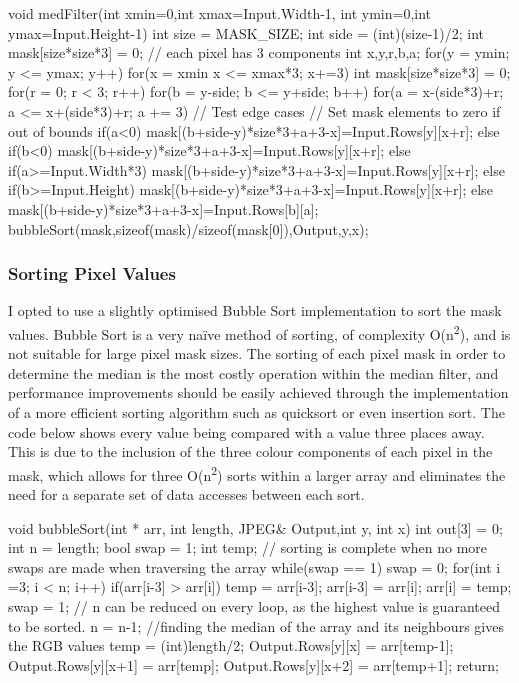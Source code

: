\begin{Cpp}

void medFilter(int xmin=0,int xmax=Input.Width-1,
               int ymin=0,int ymax=Input.Height-1){
  int size = MASK_SIZE;
  int side = (int)(size-1)/2;
  int mask[size*size*3] = {0}; // each pixel has 3 components
  int x,y,r,b,a;
  for(y = ymin; y <= ymax; y++){
    for(x = xmin x <= xmax*3; x+=3){
      int mask[size*size*3] = {0};
      for(r = 0; r < 3; r++){
        for(b = y-side; b <= y+side; b++){
          for(a = x-(side*3)+r; a <= x+(side*3)+r; a += 3){
            // Test edge cases
            // Set mask elements to zero if out of bounds              
            if(a<0)
              mask[(b+side-y)*size*3+a+3-x]=Input.Rows[y][x+r];
            else if(b<0)
              mask[(b+side-y)*size*3+a+3-x]=Input.Rows[y][x+r];
            else if(a>=Input.Width*3)
              mask[(b+side-y)*size*3+a+3-x]=Input.Rows[y][x+r];
            else if(b>=Input.Height)
              mask[(b+side-y)*size*3+a+3-x]=Input.Rows[y][x+r];
            else
              mask[(b+side-y)*size*3+a+3-x]=Input.Rows[b][a];
          }}      }
      bubbleSort(mask,sizeof(mask)/sizeof(mask[0]),Output,y,x);
    }}}
\end{Cpp}

\subsubsection{Sorting Pixel Values}
I opted to use a slightly optimised Bubble Sort implementation to sort the mask values. Bubble Sort is a very na{\"i}ve method of sorting, of complexity O(n\textsuperscript{2}), and is not suitable for large pixel mask sizes. The sorting of each pixel mask in order to determine the median is the most costly operation within the median filter, and performance improvements should be easily achieved through the implementation of a more efficient sorting algorithm such as quicksort or even insertion sort. The code below shows every value being compared with a value three places away. This is due to the inclusion of the three colour components of each pixel in the mask, which allows for three O(n\textsuperscript{2}) sorts within a larger array and eliminates the need for a separate set of data accesses between each sort.

\begin{Cpp}
void bubbleSort(int * arr, int length, JPEG& Output,int y, int x){
  int out[3] = {0};
  int n = length;
  bool swap = 1;
  int temp;
  // sorting is complete when no more swaps are made when traversing the array
  while(swap == 1){
    swap = 0;
    for(int i =3; i < n; i++){
      if(arr[i-3] > arr[i]){
        temp = arr[i-3];
        arr[i-3] = arr[i];
        arr[i] = temp;
        swap = 1;}}
    // n can be reduced on every loop, as the highest value is guaranteed to be sorted.
    n = n-1;}
  //finding the median of the array and its neighbours gives the RGB values
  temp = (int)length/2;
  Output.Rows[y][x] = arr[temp-1];
  Output.Rows[y][x+1] = arr[temp];
  Output.Rows[y][x+2] = arr[temp+1];
  return;}
\end{Cpp}


